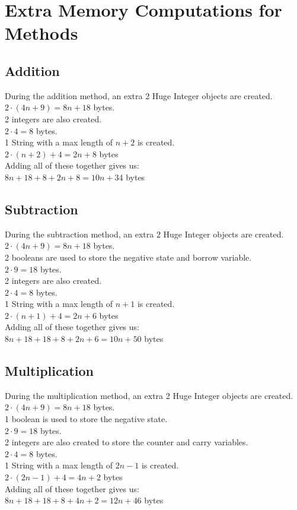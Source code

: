 \documentclass[12pt, letterpaper, titlepage, hidelinks]{article}
\begin{document}
\section{Extra Memory Computations for Methods}
	\subsection{Addition}
		During the addition method, an extra 2 Huge Integer objects are created.\\
\indent		$2\cdot (4n+9) = 8n+18$ bytes.\\
		2 integers are also created.\\
\indent		$2\cdot 4 = 8$ bytes.\\
		1 String with a max length of $n+2$ is created.\\
\indent		$2\cdot (n+2) + 4 = 2n+8$ bytes\\
		Adding all of these together gives us:\\
\indent		$8n+18 + 8 + 2n + 8 = 10n + 34$ bytes
	\subsection{Subtraction}
		During the subtraction method, an extra 2 Huge Integer objects are created.\\
\indent		$2\cdot (4n+9) = 8n+18$ bytes.\\
		2 booleans are used to store the negative state and borrow variable.\\
\indent		$2\cdot9 = 18$ bytes.\\
		2 integers are also created.\\
\indent		$2\cdot 4 = 8$ bytes.\\
		1 String with a max length of $n+1$ is created.\\
\indent		$2\cdot (n+1) + 4 = 2n+6$ bytes\\
		Adding all of these together gives us:\\
\indent		$8n+18 + 18 + 8 + 2n+6 = 10n + 50$ bytes

	\subsection{Multiplication}
		During the multiplication method, an extra 2 Huge Integer objects are created.\\
\indent		$2\cdot (4n+9) = 8n+18$ bytes.\\
		1 boolean is used to store the negative state.\\
\indent		$2\cdot9 = 18$ bytes.\\
		2 integers are also created to store the counter and carry variables.\\
\indent		$2\cdot 4 = 8$ bytes.\\
		1 String with a max length of $2n-1$ is created.\\
\indent		$2\cdot (2n-1) + 4 = 4n+2$ bytes\\
		Adding all of these together gives us:\\
\indent		$8n+18 + 18 + 8 + 4n+2 = 12n + 46$ bytes
	
\end{document}
